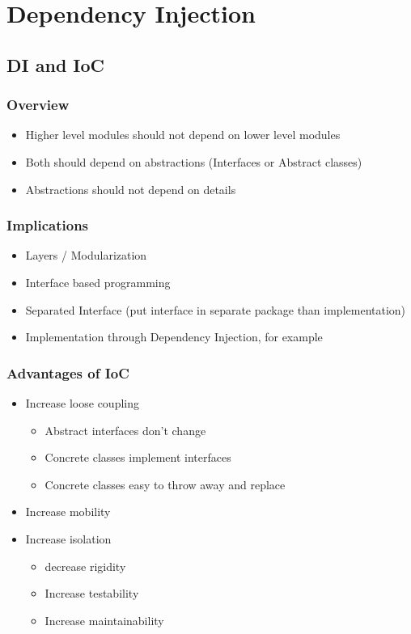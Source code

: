 \documentclass[10pt]{article}
\begin{document}
\pagebreak
\section{Dependency Injection}
\subsection{DI and IoC}
\subsubsection{Overview}
\begin{itemize}
	\item Higher level modules should not depend on lower level modules
	\item Both should depend on abstractions (Interfaces or Abstract classes)
	\item Abstractions should not depend on details
\end{itemize}
\subsubsection{Implications}
\begin{itemize}
	\item Layers / Modularization
	\item Interface based programming
	\item Separated Interface (put interface in separate package than implementation)
	\item Implementation through Dependency Injection, for example
\end{itemize}
\subsubsection{Advantages of IoC}
\begin{itemize}
	\item Increase loose coupling
	\begin{itemize}
		\item Abstract interfaces don't change
		\item Concrete classes implement interfaces
		\item Concrete classes easy to throw away and replace
	\end{itemize}
	\item Increase mobility
	\item Increase isolation
	\begin{itemize}
		\item decrease rigidity
		\item Increase testability
		\item Increase maintainability
	\end{itemize}
\end{itemize}
\end{document}
